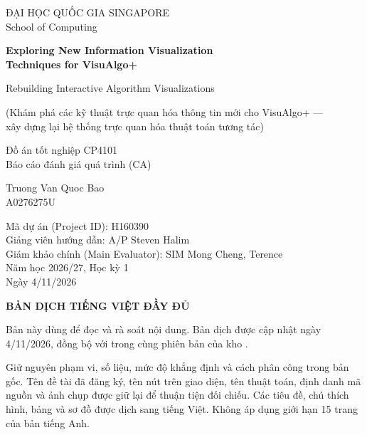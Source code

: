 \documentclass[11pt,a4paper]{article}
\begin{document}
\begin{titlepage}
\centering
{\large ĐẠI HỌC QUỐC GIA SINGAPORE\\School of Computing\par}
\vspace{16mm}
{\LARGE\bfseries\color{navy}Exploring New Information Visualization\\Techniques for VisuAlgo+\par}
\vspace{4mm}
{\large Rebuilding Interactive Algorithm Visualizations\par}
\vspace{3mm}
{\small\color{muted}(Khám phá các kỹ thuật trực quan hóa thông tin mới cho VisuAlgo+ ---\\xây dựng lại hệ thống trực quan hóa thuật toán tương tác)\par}
\vspace{9mm}
{\Large Đồ án tốt nghiệp CP4101\\Báo cáo đánh giá quá trình (CA)\par}
\vspace{10mm}
{\large Truong Van Quoc Bao\\A0276275U\par}
\vspace{6mm}
{Mã dự án (Project ID): H160390\\Giảng viên hướng dẫn: A/P Steven Halim\\Giám khảo chính (Main Evaluator): SIM Mong Cheng, Terence\\Năm học 2026/27, Học kỳ 1\\Ngày 4/11/2026\par}
\vspace{9mm}
{\large\bfseries BẢN DỊCH TIẾNG VIỆT ĐẦY ĐỦ\par}
\vspace{5mm}
\begin{minipage}{.91\textwidth}
Bản này dùng để đọc và rà soát nội dung. Bản dịch được cập nhật ngày 4/11/2026, đồng bộ với  trong cùng phiên bản của kho .

Giữ nguyên phạm vi, số liệu, mức độ khẳng định và cách phân công trong bản gốc. Tên đề tài đã đăng ký, tên nút trên giao diện, tên thuật toán, định danh mã nguồn và ảnh chụp được giữ lại để thuận tiện đối chiếu. Các tiêu đề, chú thích hình, bảng và sơ đồ được dịch sang tiếng Việt. Không áp dụng giới hạn 15 trang của bản tiếng Anh.
\end{minipage}
\end{titlepage}
\setcounter{page}{2}
\end{document}
